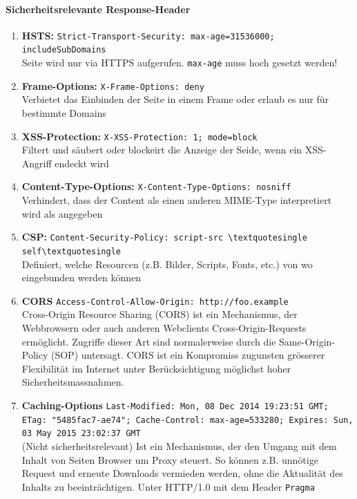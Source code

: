 \documentclass[10pt,a4paper]{article}
\begin{document}
\paragraph*{Sicherheitsrelevante Response-Header}
\begin{enumerate}[noitemsep,topsep=0pt,leftmargin=*]
    \item \textbf{HSTS:} \verb|Strict-Transport-Security: max-age=31536000; includeSubDomains|\\
    Seite wird nur via HTTPS aufgerufen. \verb|max-age| muss hoch gesetzt werden!
    \item \textbf{Frame-Options:} \verb|X-Frame-Options: deny|\\
    Verbietet das Einbinden der Seite in einem Frame oder erlaub es nur für bestimmte Domains
    \item \textbf{XSS-Protection:} \verb|X-XSS-Protection: 1; mode=block|\\
    Filtert und säubert oder blockeirt die Anzeige der Seide, wenn ein XSS-Angriff endeckt wird
    \item \textbf{Content-Type-Options:} \verb|X-Content-Type-Options: nosniff|\\
    Verhindert, dass der Content als einen anderen MIME-Type interpretiert wird als angegeben
    \item \textbf{CSP:} \verb|Content-Security-Policy: script-src \textquotesingle self\textquotesingle|\\
    Definiert, welche Resourcen (z.B. Bilder, Scripts, Fonts, etc.) von wo eingebunden werden können
    \item \textbf{CORS} \verb|Access-Control-Allow-Origin: http://foo.example|\\
    Cross-Origin Resource Sharing (CORS) ist ein Mechanismus, der Webbrowsern oder auch anderen Webclients Cross-Origin-Requests ermöglicht. Zugriffe dieser Art sind normalerweise durch die Same-Origin-Policy (SOP) untersagt. CORS ist ein Kompromiss zugunsten grösserer Flexibilität im Internet unter Berücksichtigung möglichst hoher Sicherheitsmassnahmen.
    \item \textbf{Caching-Options} \verb|Last-Modified: Mon, 08 Dec 2014 19:23:51 GMT; ETag: "5485fac7-ae74"; Cache-Control: max-age=533280; Expires: Sun, 03 May 2015 23:02:37 GMT|\\ (Nicht sicherheitsrelevant) Ist ein Mechanismus, der den Umgang mit dem Inhalt von Seiten Browser um Proxy steuert. So können z.B. unnötige Request und erneute Downloads vermieden werden, ohne die Aktualität des Inhalts zu beeinträchtigen. Unter HTTP/1.0 mit dem Header \verb|Pragma|

\end{enumerate}
\end{document}
